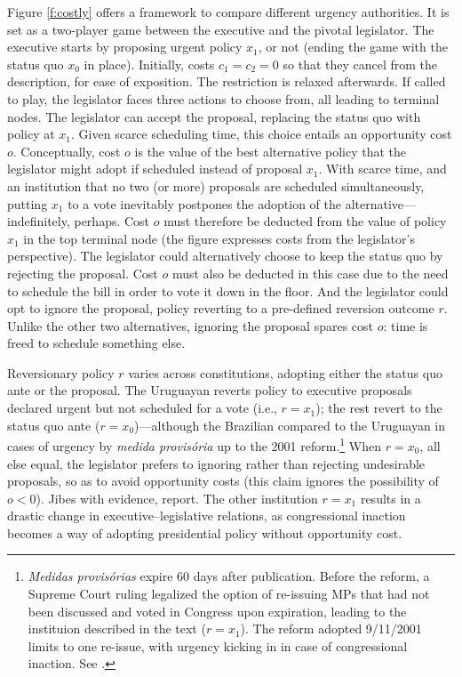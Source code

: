 \documentclass[letter,12pt]{article}
\begin{document}
Figure \ref{f:costly} offers a framework to compare different urgency authorities. It is set as a two-player game between the executive and the pivotal legislator. The executive starts by proposing urgent policy $x_1$, or not (ending the game with the status quo $x_0$ in place). Initially, costs $c_1 = c_2 = 0$ so that they cancel from the description, for ease of exposition. The restriction is relaxed afterwards. If called to play, the legislator faces three actions to choose from, all leading to terminal nodes. The legislator can accept the proposal, replacing the status quo with policy at $x_1$. Given scarce scheduling time, this choice entails an opportunity cost $o$. Conceptually, cost $o$ is the value of the best alternative policy that the legislator might adopt if scheduled instead of proposal $x_1$. With scarce time, and an institution that no two (or more) proposals are scheduled simultaneously, putting $x_1$ to a vote inevitably postpones the adoption of the alternative---indefinitely, perhaps. Cost $o$ must therefore be deducted from the value of policy $x_1$ in the top terminal node (the figure expresses costs from the legislator's perspective). The legislator could alternatively choose to keep the status quo by rejecting the proposal. Cost $o$ must also be deducted in this case due to the need to schedule the bill in order to vote it down in the floor. And the legislator could opt to ignore the proposal, policy reverting to a pre-defined reversion outcome $r$. Unlike the other two alternatives, ignoring the proposal spares cost $o$: time is freed to schedule something else. 

Reversionary policy $r$ varies across constitutions, adopting either the status quo ante or the proposal. The Uruguayan reverts policy to executive proposals declared urgent but not scheduled for a vote (i.e., $r=x_1$); the rest revert to the status quo ante ($r=x_0$)---although the Brazilian compared to the Uruguayan in cases of urgency by \emph{medida provis\'oria} up to the 2001 reform.\footnote{\emph{Medidas provis\'orias} expire 60 days after publication. Before the reform, a Supreme Court ruling legalized the option of re-issuing MPs that had not been discussed and voted in Congress upon expiration, leading to the instituion described in the text ($r=x_1$). The reform adopted 9/11/2001 limits to one re-issue, with urgency kicking in in case of congressional inaction. See \citet{figueiredo.etal.1996}.} When $r=x_0$, all else equal, the legislator prefers to ignoring rather than rejecting undesirable proposals, so as to avoid opportunity costs (this claim ignores the possibility of $o<0$). Jibes with evidence, report. The other institution $r=x_1$ results in a drastic change in executive--legislative relations, as congressional inaction becomes a way of adopting presidential policy without opportunity cost.  
\end{document}
